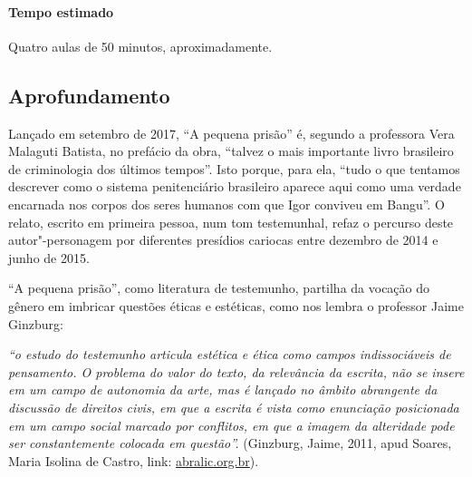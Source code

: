 \documentclass[11pt]{extarticle}
\begin{document}
\paragraph{Tempo estimado} Quatro aulas de 50 minutos, aproximadamente.


\subsection{Aprofundamento}

Lançado em setembro de 2017, ``A pequena prisão'' é, segundo a
professora Vera Malaguti Batista, no prefácio da obra, ``talvez o mais
importante livro brasileiro de criminologia dos últimos tempos''. Isto
porque, para ela, ``tudo o que tentamos descrever como o sistema
penitenciário brasileiro aparece aqui como uma verdade encarnada nos
corpos dos seres humanos com que Igor conviveu em Bangu''. O relato,
escrito em primeira pessoa, num tom testemunhal, refaz o percurso deste
autor"-personagem por diferentes presídios cariocas entre dezembro de
2014 e junho de 2015.


``A pequena prisão'', como literatura de testemunho, partilha da vocação
do gênero em imbricar questões éticas e estéticas, como nos lembra o
professor Jaime Ginzburg:

\emph{``o estudo do testemunho articula estética e ética como campos
indissociáveis de pensamento. O problema do valor do texto, da
relevância da escrita, não se insere em um campo de autonomia da arte,
mas é lançado no âmbito abrangente da discussão de direitos civis, em
que a escrita é vista como enunciação posicionada em um campo social
marcado por conflitos, em que a imagem da alteridade pode ser
constantemente colocada em questão''.} (Ginzburg, Jaime, 2011, apud
Soares, Maria Isolina de Castro, link:
\href{https://abralic.org.br/anais/arquivos/2018\_1547730007.pdf}{abralic.org.br}).
\end{document}
